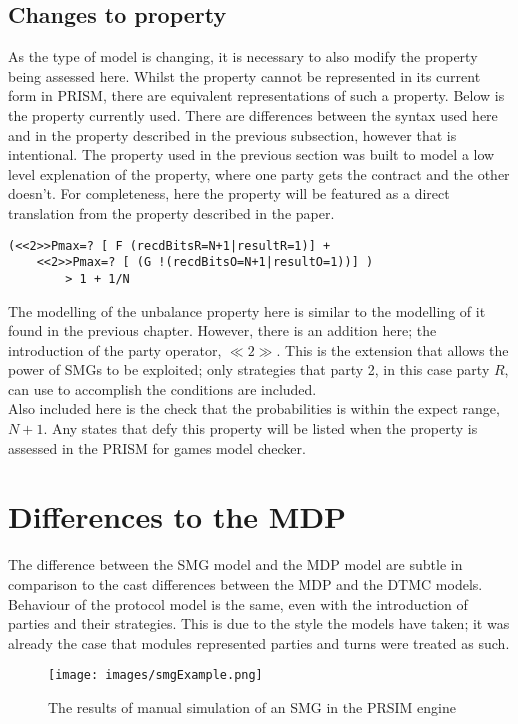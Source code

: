 \documentclass{l4proj}
\begin{document}
\subsection{Changes to property}

As the type of model is changing, it is necessary to also modify the property being assessed here. Whilst the property cannot be represented in its current form in PRISM, there are equivalent representations of such a property. Below is the property currently used. There are differences between the syntax used here and in the property described in the previous subsection, however that is intentional. The property used in the previous section was built to model a low level explenation of the property, where one party gets the contract and the other doesn't. For completeness, here the property will be featured as a direct translation from the property described in the paper. 

\begin{lstlisting}
(<<2>>Pmax=? [ F (recdBitsR=N+1|resultR=1)] + 
    <<2>>Pmax=? [ (G !(recdBitsO=N+1|resultO=1))] ) 
        > 1 + 1/N
\end{lstlisting}

The modelling of the unbalance property here is similar to the modelling of it found in the previous chapter. However, there is an addition here; the introduction of the party operator, $\ll 2 \gg$. This is the extension that allows the power of SMGs to be exploited; only strategies that party 2, in this case party $R$, can use to accomplish the conditions are included. \\
Also included here is the check that the probabilities is within the expect range, $N+1$. Any states that defy this property will be listed when the property is assessed in the PRISM for games model checker.

\section{Differences to the MDP}

The difference between the SMG model and the MDP model are subtle in comparison to the cast differences between the MDP and the DTMC models. Behaviour of the protocol model is the same, even with the introduction of parties and their strategies. This is due to the style the models have taken; it was already the case that modules represented parties and turns were treated as such. 

\begin{figure}[ht!]
\centering
\texttt{[image: images/smgExample.png]}
\caption{The results of manual simulation of an SMG in the PRSIM engine}
\label{smgEx}
\end{figure}
\end{document}
